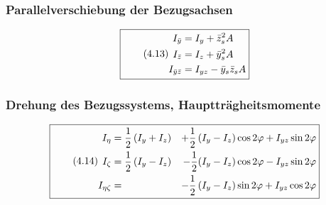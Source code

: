 \documentclass[11pt]{article}
\newcommand{\1}{ {\mathds{1}} }
\begin{document}
%
%
%
%

		\subsubsection{Parallelverschiebung der Bezugsachsen}

		\begin{equation}
			\boxed{
				\tag{4.13}
				\begin{split}
					I_{\bar{y}} &= I_y + \bar{z}^2_s A\\
					I_{\bar{z}} &= I_z + \bar{y}^2_s A\\
					I_{\bar{y} \bar{z}} &= I_{yz} - \bar{y}_{s} \bar{z}_{s} A
				\end{split}
			}
		\end{equation}

		\subsubsection{Drehung des Bezugssystems, Hauptträgheitsmomente}

		\begin{equation}
			\boxed{
				\tag{4.14}
				\begin{split}
					I_{\eta} &= \frac{1}{2}\left( I_y + I_z \right) &+ \frac{1}{2}\left( I_y - I_z \right)\cos{2\varphi} + I_{yz} \sin{2\varphi}\\
					I_{\zeta} &= \frac{1}{2}\left( I_y - I_z \right)&-\frac{1}{2}(I_y-I_z)\cos{2\varphi} -I_{yz}\sin{2\varphi}\\
					I_{\eta \zeta} &=  &-\frac{1}{2}\left( I_y - I_z \right)\sin{2\varphi} + I_{yz}\cos{2\varphi}
				\end{split}
			}
		\end{equation}
\end{document}
